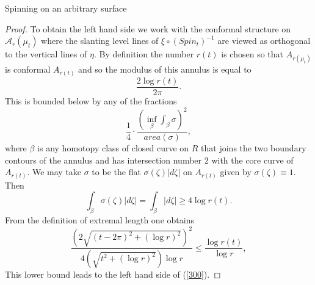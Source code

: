 \documentclass[12pt]{amsart}
\theoremstyle{remark}
\theoremstyle{definition}
\theoremstyle{definition}
\begin{document}
\begin{section}{Spinning on an arbitrary surface}
\begin{proof}
To obtain the left hand side we work with the conformal structure on ${\mathcal A}_r(\mu_t)$ where 
the slanting level lines of $\xi \circ (Spin_t)^{-1}$ are viewed as orthogonal to the vertical 
lines of $\eta.$ By definition the number $r(t)$ is chosen so that $A_{r(\mu_t)}$ is conformal  
$A_{r(t)}$ and so the modulus of this annulus is equal to 
$$\frac{2\log r(t)}{2 \pi}.$$ 
This is bounded below by any of the fractions
$$\frac{1}{4} \cdot \frac{(\inf_{\beta} \int_{\beta} \sigma)^2}{area(\sigma)},$$
where $\beta$ is any homotopy class of closed curve on $R$  that joins the two boundary contours of the annulus and has intersection number $2$ with the core curve of $A_{r(t)}.$
We may take $\sigma$ to be the flat $\sigma(\zeta)|d\zeta|$ on $A_{r(t)}$  given by 
$\sigma({\zeta}) \equiv 1.$  Then $$\int_{\beta}\sigma(\zeta) |d\zeta| =\int_{\beta} |d\zeta| \geq 4 \log r(t).$$
From the definition of extremal length one obtains
$$\frac{\left(2\sqrt{(t-2\pi)^2+ (\log r)^2}\right)^2}{4 \left(\sqrt{t^2+ (\log r)^2}\right)
\log r} \leq \frac{\log r(t)}{\log r},$$
This lower bound leads to the left hand side of (\ref{300}).
\end{proof} 


   
   \end{section} 
        
\end{document}
